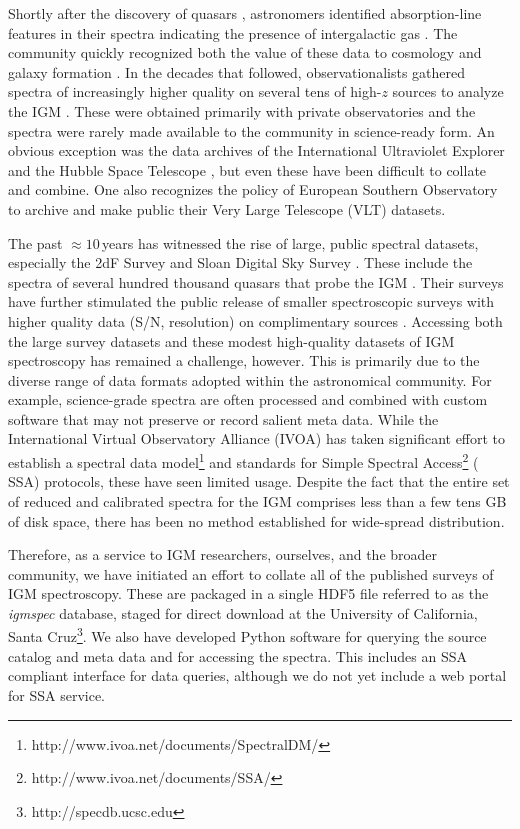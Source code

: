 \documentclass[12pt]{elsarticle}
\begin{document}
Shortly after the discovery of quasars \cite{schmidt63},
astronomers identified absorption-line features in their 
spectra indicating the presence of intergalactic gas
\citep{bs65,blb66}.  
The community quickly recognized both the value of these
data to cosmology and galaxy formation \citep{gp65,bs69}.
In the decades that followed, observationalists gathered
spectra of increasingly higher quality on several tens of
high-$z$ sources to analyze the IGM 
\citep{sargent80,tytler82,wolfe86,lzt91}.
These were obtained primarily with private observatories and
the spectra were rarely made available
to the community in science-ready form.
An obvious exception was the data archives of the
International Ultraviolet Explorer
and the Hubble Space Telescope 
\citep[{\it HST};][]{hstkeyproj_1,bechtold02},
but even these have been difficult to  collate and combine.
One also recognizes the policy of European Southern
Observatory to archive and
make public their Very Large Telescope (VLT) datasets.

The past $\approx 10$\,years has witnessed the
rise of large, public spectral datasets, especially
the 2dF Survey and Sloan Digital Sky Survey \citep[SDSS;][]{yaa+00,croom01}.
These include the spectra of several hundred thousand quasars
that probe the IGM \citep[e.g.][]{sdss_qso_dr7}.
Their surveys have further stimulated the public release
of smaller spectroscopic surveys with higher quality
data (S/N, resolution) on complimentary sources
\citep[e.g.][]{pwh+07,prochaska+15}.
Accessing both the large survey datasets 
and these modest high-quality datasets of IGM spectroscopy
has remained a challenge, however. 
This is primarily due to the diverse range of 
data formats adopted within 
the astronomical community.
For example, science-grade spectra are often processed and combined
with custom software that may not preserve or record salient meta 
data.  While the International Virtual Observatory Alliance (IVOA)
has taken significant effort to establish a
spectral data model\footnote{http://www.ivoa.net/documents/SpectralDM/}
and  standards for Simple Spectral Access\footnote{http://www.ivoa.net/documents/SSA/} (
SSA) protocols, these have seen limited usage.
Despite the fact that the entire set of
reduced and calibrated spectra for the IGM
comprises less than a few tens GB of disk space,
there has been no method established for
wide-spread distribution.

Therefore, as a service to IGM researchers, ourselves, and the
broader community, we have initiated an effort to collate 
all of the published surveys of IGM spectroscopy. 
These are packaged in a single HDF5 file referred to as
the {\it igmspec} database, staged for direct download
at the University of California, 
Santa Cruz\footnote{http://specdb.ucsc.edu}.
We also have developed Python software 
for querying the source catalog and meta data
and for accessing the spectra. 
This includes an SSA compliant interface for data queries,
although we do not yet include a web portal for SSA service.
\end{document}
